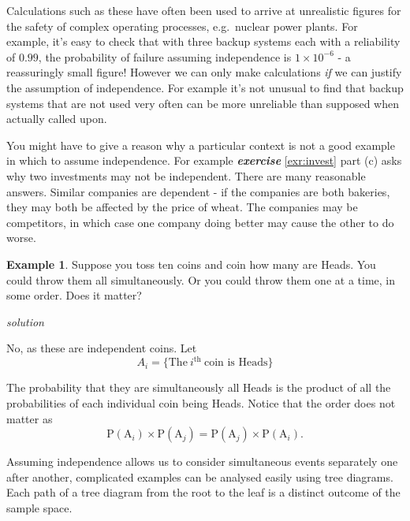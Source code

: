 \documentclass[
]{book}
\theoremstyle{definition}
\theoremstyle{definition}
\newtheorem{example}{Example}[chapter]
\theoremstyle{definition}
\theoremstyle{definition}
\theoremstyle{remark}
\begin{document}
Calculations such as these have often been used to arrive at unrealistic figures for the safety of complex operating processes, e.g.~nuclear power plants. For example, it's easy to check that with three backup systems each with a reliability of \(0.99\), the probability of failure assuming independence is \(1\times 10^{-6}\) - a reassuringly small figure! However we can only make calculations \emph{if} we can justify the assumption of independence. For example it's not unusual to find that backup systems that are not used very often can be more unreliable than supposed when actually called upon.

You might have to give a reason why a particular context is not a good example in which to assume independence. For example \textbf{\emph{exercise}} \ref{exr:invest} part (c) asks why two investments may not be independent. There are many reasonable answers. Similar companies are dependent - if the companies are both bakeries, they may both be affected by the price of wheat. The companies may be competitors, in which case one company doing better may cause the other to do worse.

\begin{example}
Suppose you toss ten coins and coin how many are Heads. You could throw them all simultaneously. Or you could throw them one at a time, in some order. Does it matter?

\emph{solution}

No, as these are independent coins. Let
\[A_i =\{\text{The} \ i^{\text{th}} \ \text{coin is Heads} \}\]

The probability that they are simultaneously all Heads is the product of all the probabilities of each individual coin being Heads.
Notice that the order does not matter as
\[\text{P}(\text{A}_i)\times \text{P}(\text{A}_j) = \text{P}(\text{A}_j)\times \text{P}(\text{A}_i).\]
\end{example}

Assuming independence allows us to consider simultaneous events separately one after another, complicated examples can be analysed easily using tree diagrams. Each path of a tree diagram from the root to the leaf is a distinct outcome of the sample space.
\end{document}
